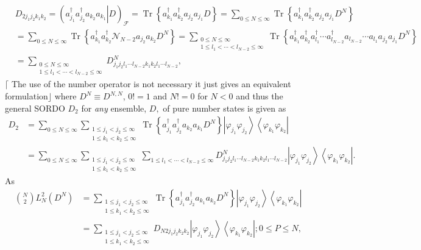 \documentclass[aps,preprint]{revtex4}%
\begin{document}
\begin{align}
&  D_{2j_{1}j_{2}k_{1}k_{2}}=\left(  \left.  a_{j_{1}}^{\dagger}a_{j_{2}%
}^{\dagger}a_{k_{2}}a_{k_{1}}\right\vert D\right)  _{\mathcal{F}%
}=\operatorname{Tr}\left\{  a_{k_{1}}^{\dagger}a_{k_{2}}^{\dagger}a_{j_{2}%
}a_{j_{1}}D\right\}  =\sum_{0\leq N\leq\infty}\operatorname{Tr}\left\{
a_{k_{1}}^{\dagger}a_{k_{2}}^{\dagger}a_{j_{2}}a_{j_{1}}D^{N}\right\}
\nonumber\\
&  =\sum_{0\leq N\leq\infty}\operatorname{Tr}\left\{  a_{k_{1}}^{\dagger
}a_{k_{2}}^{\dagger}\mathcal{N}_{N-2}a_{j_{2}}a_{k_{2}}D^{N}\right\}
=\sum_{\substack{0\leq N\leq\infty\\1\leq l_{1}<\cdots<l_{N-2}\leq\infty
}}\operatorname{Tr}\left\{  a_{k_{1}}^{\dagger}a_{k_{2}}^{\dagger}a_{l_{1}%
}^{\dagger}\cdots a_{l_{N-2}}^{\dagger}a_{l_{N-2}}\cdots a_{l_{1}}a_{j_{2}%
}a_{j_{1}}D^{N}\right\}  \nonumber\\
&  =\sum_{\substack{0\leq N\leq\infty\\1\leq l_{1}<\cdots<l_{N-2}\leq\infty
}}D_{j_{1}j_{2}l_{1}\cdots l_{N-2}k_{1}k_{2}l_{1}\cdots l_{N-2}}^{N},
\end{align}
$\lceil$ The use of the number operator is not necessary it just gives an
equivalent formulation$\rfloor$ where $D^{N}\equiv D^{N,N}$, $0!=1$ and $N!=0$
for $N<0$ and thus the general SORDO $D_{2}$ for \emph{any }ensemble, $D,$ of
pure number states is given as
\begin{align}
D_{2} &  =\sum_{0\leq N\leq\infty}\sum_{\substack{1\leq j_{1}<j_{2}\leq
\infty\\1\leq k_{1}<k_{2}\leq\infty}}\operatorname{Tr}\left\{  a_{j_{1}%
}^{\dagger}a_{j_{2}}^{\dagger}a_{k_{2}}a_{k_{1}}D^{N}\right\}  \left\vert
\varphi_{j_{1}}\varphi_{j_{2}}\right\rangle \left\langle \varphi_{k_{1}%
}\varphi_{k_{2}}\right\vert \nonumber\\
&  =\sum_{0\leq N\leq\infty}\sum_{\substack{1\leq j_{1}<j_{2}\leq\infty\\1\leq
k_{1}<k_{2}\leq\infty}}\sum_{1\leq l_{1}<\cdots<l_{N-2}\leq\infty}%
D_{j_{1}j_{2}l_{1}\cdots l_{N-2}k_{1}k_{2}l_{1}\cdots l_{N-2}}^{N}\left\vert
\varphi_{j_{1}}\varphi_{j_{2}}\right\rangle \left\langle \varphi_{k_{1}%
}\varphi_{k_{2}}\right\vert .
\end{align}
As%
\begin{align}
\binom{N}{2}L_{N}^{2}\left(  D^{N}\right)   &  =\sum_{\substack{1\leq
j_{1}<j_{2}\leq\infty\\1\leq k_{1}<k_{2}\leq\infty}}\operatorname{Tr}\left\{
a_{j_{1}}^{\dagger}a_{j_{2}}^{\dagger}a_{k_{1}}a_{k_{2}}D^{N}\right\}
\left\vert \varphi_{j_{1}}\varphi_{j_{2}}\right\rangle \left\langle
\varphi_{k_{1}}\varphi_{k_{2}}\right\vert \nonumber\\
&  =\sum_{\substack{1\leq j_{1}<j_{2}\leq\infty\\1\leq k_{1}<k_{2}\leq\infty
}}D_{N2j_{1}j_{2}k_{2}k_{2}}\left\vert \varphi_{j_{1}}\varphi_{j_{2}%
}\right\rangle \left\langle \varphi_{k_{1}}\varphi_{k_{2}}\right\vert ;0\leq
P\leq N,
\end{align}
\end{document}

